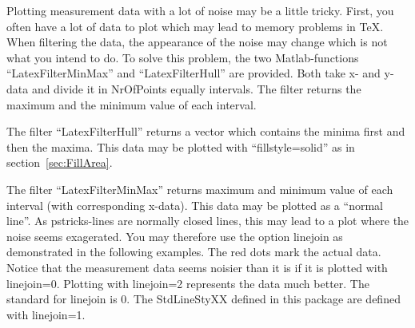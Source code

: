 Plotting measurement data with a lot of noise may be a little tricky. First, you
often have a lot of data to plot which may lead to memory problems in \TeX.
When filtering the data, the appearance of the noise may change which is not
what you intend to do. To solve this problem, the two Matlab-functions
``LatexFilterMinMax'' and ``LatexFilterHull'' are provided. Both take x- and
y-data and divide it in NrOfPoints equally intervals. The filter returns the
maximum and the minimum value of each interval.

The filter ``LatexFilterHull'' returns a vector which contains the minima first
and then the maxima. This data may be plotted with ``fillstyle=solid'' as in
section~\ref{sec:FillArea}.

The filter ``LatexFilterMinMax'' returns maximum and minimum value of each
interval (with corresponding x-data). This data may be plotted as a ``normal
line''. As pstricks-lines are normally closed lines, this may lead to a plot
where the noise seems exagerated. You may therefore use the option linejoin as
demonstrated in the following examples. The red dots mark the actual data.
Notice that the measurement data seems noisier than it is if it is plotted with
linejoin=0. Plotting with linejoin=2 represents the data much better. The
standard for linejoin is 0. The StdLineStyXX defined in this package are defined
with linejoin=1.


